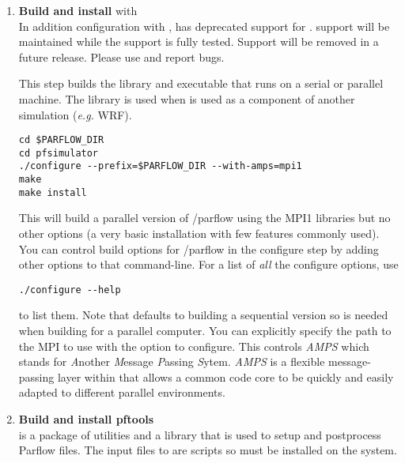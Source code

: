 \begin{enumerate}
\item {\bf Build and install \parflow{}} with \\

In addition configuration with , \parflow{} has deprecated
support for .  support will be
maintained while the  support is fully tested.  Support
will be removed in a future release.  Please use  and
report bugs.
  
This step builds the \parflow{} library and executable that runs on
a serial or parallel machine.  The library is used when
 \parflow{} is used as a component of another simulation (\emph{e.g.}
 WRF).  

\begin{display}\begin{verbatim}
cd $PARFLOW_DIR
cd pfsimulator
./configure --prefix=$PARFLOW_DIR --with-amps=mpi1
make 
make install
\end{verbatim}\end{display}

This will build a parallel version of /parflow{} using the MPI1 
libraries but no other options (a very basic installation with few features commonly used).
You can control build options for /parflow{} in the configure step by adding other 
options to that command-line. For a list of \emph{all} the configure options, use
\begin{display}\begin{verbatim}
./configure --help 
\end{verbatim}\end{display} to list them.  Note that \parflow{} defaults to building a sequential version so
 is needed when building for a parallel computer.
  You can explicitly specify the path to the MPI to use with the
  option to configure.  This controls \emph{AMPS}
 which stands for \emph{A}nother \emph{M}essage \emph{P}assing
 \emph{S}ytem.  \emph{AMPS} is a flexible message-passing layer within
 \parflow{} that allows a common code core to be quickly and easily
 adapted to different parallel environments. 

\item {\bf Build and install pftools}\\ 
 is a package of utilities and a  library that
 is used to setup and postprocess Parflow files.  The input files to
 \parflow{} are  scripts so  must be installed on
 the system.


\end{enumerate}

